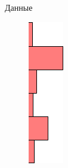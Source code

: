 \documentclass{beamer}
\begin{document}
\begin{frame}{Данные}
\begin{minipage}[t]{0.45\linewidth}
\end{minipage}
\hspace{-0.65cm}
\begin{minipage}[t]{0.02\columnwidth}
	\vspace{0.78cm}
	\begin{figure}[h]
		\centering
		\includegraphics[width=2.3\linewidth]{hist1.png}

\end{figure}
\end{minipage}
\end{frame}
\end{document}
